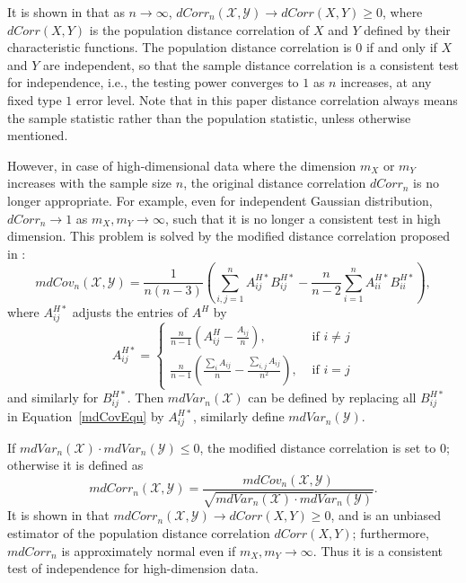 \documentclass[11pt]{article}
\begin{document}
It is shown in \cite{SzekelyRizzoBakirov2007} that as $n \rightarrow \infty$, $dCorr_{n}(\mathcal{X},\mathcal{Y}) \rightarrow dCorr(X,Y) \geq 0$, where $dCorr(X,Y)$ is the population distance correlation of $X$ and $Y$ defined by their characteristic functions. The population distance correlation is $0$ if and only if $X$ and $Y$ are independent, so that the sample distance correlation is a consistent test for independence, i.e., the testing power converges to $1$ as $n$ increases, at any fixed type $1$ error level. Note that in this paper distance correlation always means the sample statistic rather than the population statistic, unless otherwise mentioned.

However, in case of high-dimensional data where the dimension $m_{X}$ or $m_{Y}$ increases with the sample size $n$, the original distance correlation $dCorr_{n}$ is no longer appropriate. For example, even for independent Gaussian distribution, $dCorr_{n} \rightarrow 1$ as $m_{X}, m_{Y} \rightarrow \infty$, such that it is no longer a consistent test in high dimension. This problem is solved by the modified distance correlation proposed in \cite{SzekelyRizzo2013a}:
\begin{equation}
\label{mdCovEqu}
mdCov_{n}(\mathcal{X},\mathcal{Y})=\frac{1}{n(n-3)}(\sum_{i,j=1}^{n}A^{H*}_{ij}B^{H*}_{ij}-\frac{n}{n-2}\sum_{i=1}^{n}A^{H*}_{ii}B^{H*}_{ii}),
\end{equation}
where $A^{H*}_{ij}$ adjusts the entries of $A^{H}$ by
\[A^{H*}_{ij} = \left\{
  \begin{array}{lr}
    \frac{n}{n-1}(A^{H}_{ij}-\frac{A_{ij}}{n}), & \mbox{ if } i \neq j \\
    \frac{n}{n-1}(\frac{\sum_{i}A_{ij}}{n}-\frac{\sum_{i,j}A_{ij}}{n^2}), &\mbox{ if } i = j
  \end{array}
\right.
\] and similarly for $B^{H*}_{ij}$. Then $mdVar_{n}(\mathcal{X})$ can be defined by replacing all $B^{H*}_{ij}$ in Equation~\ref{mdCovEqu} by $A^{H*}_{ij}$, similarly define $mdVar_{n}(\mathcal{Y})$. 

If $mdVar_{n}(\mathcal{X}) \cdot mdVar_{n}(\mathcal{Y}) \leq 0$, the modified distance correlation is set to $0$; otherwise it is defined as
\begin{equation}
\label{mdCorrEqu}
mdCorr_{n}(\mathcal{X},\mathcal{Y})=\frac{mdCov_{n}(\mathcal{X},\mathcal{Y})}{\sqrt{mdVar_{n}(\mathcal{X}) \cdot mdVar_{n}(\mathcal{Y})}}.
\end{equation}
It is shown in \cite{SzekelyRizzo2013a} that $mdCorr_{n}(\mathcal{X},\mathcal{Y}) \rightarrow dCorr(X,Y) \geq 0$, and is an unbiased estimator of the population distance correlation $dCorr(X,Y)$; furthermore, $mdCorr_{n}$ is approximately normal even if $m_{X},m_{Y} \rightarrow \infty$. Thus it is a consistent test of independence for high-dimension data.
\end{document}
